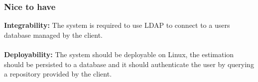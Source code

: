 \subsubsection{Nice to have}
	{\bfseries Integrability:}
	The system is required to use LDAP to connect to a users database managed by the client.
	\\ \\
	{\bfseries Deployability:} The system should be deployable on Linux, the estimation should be persisted to a database and it should authenticate the user by querying a repository provided by the client.